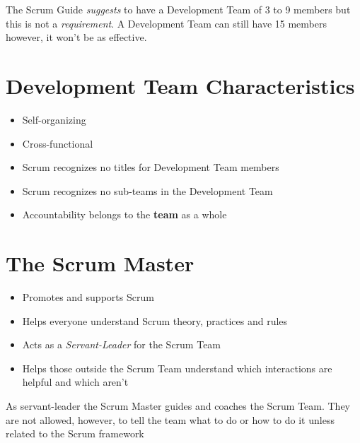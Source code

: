 \documentclass[a4paper,11pt,twocolumn]{article}
\begin{document}
\begin{tcolorbox}[colback=black!8!white,colframe=gray!50!black,title=Note,sharp corners,fonttitle=\normalsize\bfseries,fontupper=\normalsize,left=0.7em,right=0.7em]
	The Scrum Guide \textit{suggests} to have a Development Team of 3 to 9 members but this is not a \textit{requirement}. A Development Team can still have 15 members however, it won't be as effective.
\end{tcolorbox}

\section*{Development Team Characteristics}
\begin{itemize}
    \item Self-organizing
    \item Cross-functional
	\item Scrum recognizes no titles for Development Team members
	\item Scrum recognizes no sub-teams in the Development Team
	\item Accountability belongs to the \textbf{team} as a whole
\end{itemize}

\section*{The Scrum Master}
\begin{itemize}
    \item Promotes and supports Scrum
    \item Helps everyone understand Scrum theory, practices and rules 
    \item Acts as a \textit{Servant-Leader} for the Scrum Team
    \item Helps those outside the Scrum Team understand which interactions are helpful and which aren't
\end{itemize}

\begin{tcolorbox}[colback=black!8!white,colframe=gray!50!black,title=Note,sharp corners,fonttitle=\normalsize\bfseries,fontupper=\normalsize,left=0.7em,right=0.7em]
	As servant-leader the Scrum Master guides and coaches the Scrum Team. They are not allowed, however, to tell the team what to do or how to do it unless related to the Scrum framework
\end{tcolorbox}
\end{document}
